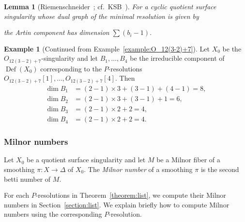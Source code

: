 \documentclass[reqno, twoside, a4paper]{amsart}
\newtheorem{lemma}[theorem]{Lemma}
\theoremstyle{definition}
\newtheorem{example}[theorem]{Example}
\numberwithin{equation}{section}
\DeclareMathOperator{\Def}{Def}
\begin{document}
\begin{lemma}[{Riemenschneider~\cite{Riemenschneider-1974}}; cf.~{KSB~\cite[Remark~3.23]{KSB-1988}}]
For a cyclic quotient surface singularity whose dual graph of the minimal resolution is given by
%
%
the Artin component has dimension $\sum(b_i-1)$.
\end{lemma}

\begin{example}[Continued from Example~\ref{example:O_12(3-2)+7}]
Let $X_0$ be the $O_{12(3-2)+7}$-singularity and let $B_1, \dotsc, B_4$ be the irreducible component of $\Def(X_0)$ corresponding to the $P$-resolutions $O_{12(3-2)+7}[1], \dotsc, O_{12(3-2)+7}[4]$. Then
%
\begin{align*}
\dim{B_1} &= (2-1) \times 3 + (3-1) + (4-1) = 8, \\
\dim{B_2} &= (2-1) \times 3 + (3-1) + 1 = 6, \\
\dim{B_3} &= (2-1) \times 2 + 2 = 4, \\
\dim{B_4} &= (2-1) \times 2 + 2 = 4.
\end{align*}
\end{example}






\subsubsection{Milnor numbers}

Let $X_0$ be a quotient surface singularity and let $M$ be a Milnor fiber of a smoothing $\pi \colon X \to \Delta$ of $X_0$. The \emph{Milnor number} of a smoothing $\pi$ is the second betti number of $M$.

For each $P$-resolutions in Theorem~\ref{theorem:list}, we compute their Milnor numbers in Section~\ref{section:list}. We explain briefly how to compute Milnor numbers using the corresponding $P$-resolution.
\end{document}
